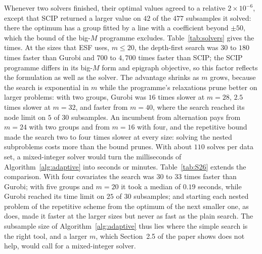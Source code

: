 Whenever two solvers finished, their optimal values agreed to a relative $2\times10^{-6}$, except
that SCIP returned a larger value on $42$ of the $477$ subsamples it solved: there the optimum has a group fitted by a line
with a coefficient beyond $\pm50$, which the bound of the big-$M$ programme excludes.
Table~\ref{tab:solvers} gives the times. At the sizes that ESF uses, $m\le20$, the
depth-first search was $30$ to $180$ times faster than Gurobi and $700$ to $4{,}700$ times faster
than SCIP; the SCIP programme differs in its big-$M$ form and epigraph objective, so this factor
reflects the formulation as well as the solver. The advantage shrinks as $m$ grows, because the search is exponential in $m$ while the
programme's relaxations prune better on larger problems: with two groups, Gurobi was $16$ times
slower at $m=28$, $2.5$ times slower at $m=32$, and faster from $m=40$, where the search reached
its node limit on $5$ of $30$ subsamples. An incumbent from alternation pays from $m=24$ with two groups and from $m=16$ with four, and the
repetitive bound made the search two to four times slower at every size: solving the nested
subproblems costs more than the bound prunes. With about $110$ solves per data set, a mixed-integer
solver would turn the milliseconds of Algorithm~\ref{alg:adaptive} into seconds or minutes. Table~\ref{tab:S26} extends the comparison. With four covariates the
search was $30$ to $33$ times faster than Gurobi; with five groups and $m=20$ it took a median of
$0.19$ seconds, while Gurobi reached its time limit on $25$ of $30$ subsamples; and starting each
nested problem of the repetitive scheme from the optimum of the next smaller one, as
\citet{brusco2006repetitive} does, made it faster at the larger sizes but never as fast as the
plain search. The
subsample size of Algorithm~\ref{alg:adaptive} thus lies where the simple search is the right
tool, and a larger $m$, which Section~2.5 of the paper shows does not help, would call for a
mixed-integer solver.
